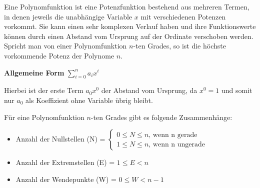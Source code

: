 \begin{figure}[h!]
\centering
\end{figure}


Eine Polynomfunktion ist eine Potenzfunktion bestehend aus mehreren Termen, in denen jeweils die unabh\"{a}ngige Variable $x$ mit verschiedenen Potenzen vorkommt. Sie kann einen sehr komplexen Verlauf haben und ihre Funktionswerte k\"{o}nnen durch einen Abstand vom Ursprung auf der Ordinate verschoben werden.
Spricht man von einer Polynomfunktion $n$-ten Grades, so ist die h\"{o}chste vorkommende Potenz der Polynome $n$.

\textbf{Allgemeine Form}  $\sum_{i=0}^{n} a_{i}x^i$

Hierbei ist der erste Term $a_{0}x^0$ der Abstand vom Ursprung, da $x^0 = 1$ und somit nur $a_{0}$ als Koeffizient ohne Variable \"{u}brig bleibt.

F\"{u}r eine Polynomfunktion $n$-ten Grades gibt es folgende Zusammenh\"{a}nge:

\begin{itemize}
	\item Anzahl der Nullstellen (N) =
	      $\begin{cases}
	      	0 \leq N \leq n\text{, wenn n gerade}\\
	      	1 \leq N \leq n\text{, wenn n ungerade}
	      \end{cases}$
	\item Anzahl der Extremstellen (E) = $1 \leq E < n$
	\item Anzahl der Wendepunkte (W) = $0 \leq W < n - 1$
\end{itemize}

